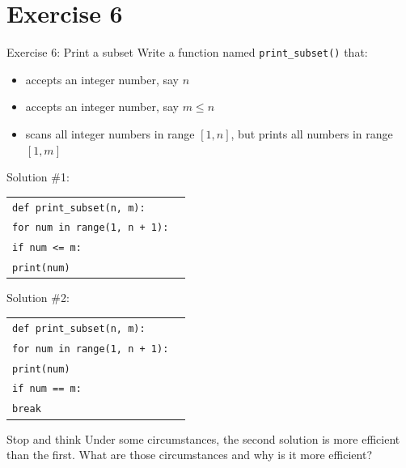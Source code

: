 \documentclass[t,handout,9pt]{beamer}
\begin{document}
\section{Exercise 6}
\begin{frame}{Exercise 6: Print a subset}
\vfill
Write a function named \texttt{print\_subset()} that:
\begin{itemize}
	\item accepts an integer number, say $n$
	\item accepts an integer number, say $m \leq n$
	\item scans all integer numbers in range $[1, n]$, but prints all numbers in range $[1, m]$
\end{itemize}
\vfill
\end{frame}
%
\begin{frame}
	\vfill
	Solution \#1:
		\begin{table}[]
		  \begin{flushleft}
		  \begin{tabular}{ll}
		  \texttt{def print\_subset(n, m):} &  \\
		  \texttt{\quad for num in range(1, n + 1):}        & \\
		  \texttt{\quad\quad if num <= m:}        & \\
		  \texttt{\quad\quad\quad print(num)}        & \\
		  \end{tabular}
		  \end{flushleft}
		\end{table}
	\vfill
	Solution \#2:
	\begin{table}[]
		\begin{flushleft}
		\begin{tabular}{ll}
		\texttt{def print\_subset(n, m):} &  \\
		\texttt{\quad for num in range(1, n + 1):}        & \\
		\texttt{\quad\quad print(num)}        & \\
		\texttt{\quad\quad if num == m:}        & \\
		\texttt{\quad\quad\quad break}        & \\
		\end{tabular}
		\end{flushleft}
	  \end{table}
	\vfill
	\begin{block}{Stop and think}
		Under some circumstances, the second solution is more efficient than the first. What are those circumstances and why is it more efficient?
	\end{block}
	\vfill
\end{frame}
\end{document}
